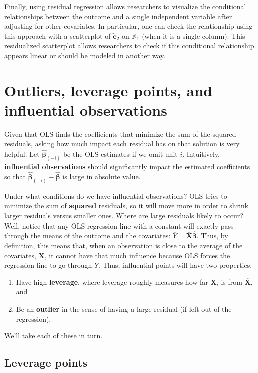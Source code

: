 \documentclass[
  13pt,
  letterpaper,
  DIV=11,
  numbers=noendperiod]{scrreprt}
\providecommand{\tightlist}{%
  \setlength{\itemsep}{0pt}\setlength{\parskip}{0pt}}\usepackage{longtable,booktabs,array}
\newcommand{\mb}{\symbf}
\newcommand{\X}{\mb{X}}
\newcommand{\Xmat}{\mathbb{X}}
\newcommand{\bhat}{\widehat{\mb{\beta}}}
\theoremstyle{definition}
\theoremstyle{definition}
\theoremstyle{plain}
\theoremstyle{remark}
\begin{document}
Finally, using residual regression allows researchers to visualize the
conditional relationships between the outcome and a single independent
variable after adjusting for other covariates. In particular, one can
check the relationship using this approach with a scatterplot of
\(\widetilde{\mb{e}}_2\) on \(\Xmat_1\) (when it is a single column).
This residualized scatterplot allows researchers to check if this
conditional relationship appears linear or should be modeled in another
way.

\section{Outliers, leverage points, and influential
observations}\label{outliers-leverage-points-and-influential-observations}

Given that OLS finds the coefficients that minimize the sum of the
squared residuals, asking how much impact each residual has on that
solution is very helpful. Let \(\bhat_{(-i)}\) be the OLS estimates if
we omit unit \(i\). Intuitively, \textbf{influential observations}
should significantly impact the estimated coefficients so that
\(\bhat_{(-i)} - \bhat\) is large in absolute value.

Under what conditions do we have influential observations? OLS tries to
minimize the sum of \textbf{squared} residuals, so it will move more in
order to shrink larger residuals versus smaller ones. Where are large
residuals likely to occur? Well, notice that any OLS regression line
with a constant will exactly pass through the means of the outcome and
the covariates: \(\overline{Y} = \overline{\X}\bhat\). Thus, by
definition, this means that, when an observation is close to the average
of the covariates, \(\overline{\X}\), it cannot have that much influence
because OLS forces the regression line to go through \(\overline{Y}\).
Thus, influential points will have two properties:

\begin{enumerate}
\def\labelenumi{\arabic{enumi}.}
\tightlist
\item
  Have high \textbf{leverage}, where leverage roughly measures how far
  \(\X_i\) is from \(\overline{\X}\), and
\item
  Be an \textbf{outlier} in the sense of having a large residual (if
  left out of the regression).
\end{enumerate}

We'll take each of these in turn.

\subsection{Leverage points}\label{sec-leverage}
\end{document}
